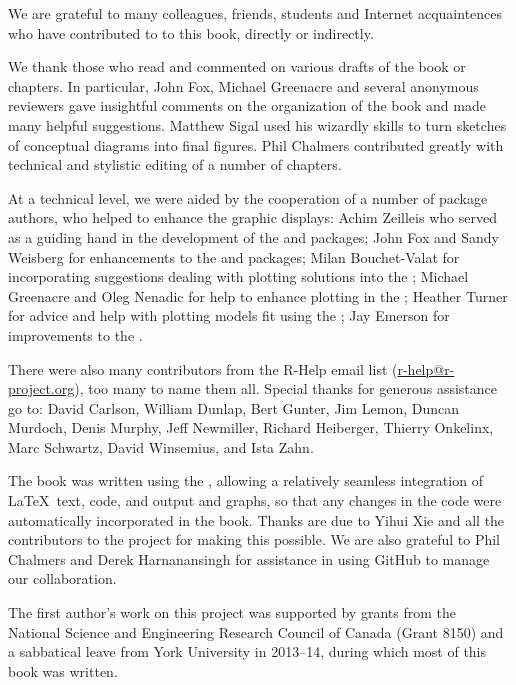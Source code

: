 We are grateful to many colleagues, friends, students and Internet acquaintences who have contributed to
to this book, directly or indirectly.

We thank those who read and commented on various drafts of the book or chapters.
In particular, John Fox, Michael Greenacre and several anonymous reviewers gave
insightful comments on the organization of the book and made many helpful suggestions.
Matthew Sigal used his wizardly skills to turn sketches of conceptual diagrams into
final figures. Phil Chalmers contributed greatly with technical and stylistic editing
of a number of chapters.

At a technical level, we were aided by the cooperation of a number of \R package authors, who
helped to enhance the graphic displays:
Achim Zeilleis who served as a guiding hand in the development of the  and  packages;
John Fox and Sandy Weisberg for enhancements to the  and  packages;
Milan Bouchet-Valat for incorporating suggestions dealing with plotting  solutions into the ;
Michael Greenacre and Oleg Nenadic for help to enhance plotting in the ;
Heather Turner for advice and help with plotting models fit using the ;
Jay Emerson for improvements to the .

There were also many contributors from the R-Help email list (\url{r-help@r-project.org}), too many to name them all.
Special thanks for generous assistance go to:
David Carlson,
William Dunlap,
Bert Gunter,
Jim Lemon,
Duncan Murdoch,
Denis Murphy,
Jeff Newmiller,
Richard Heiberger,
Thierry Onkelinx,
Marc Schwartz,
David Winsemius, and
Ista Zahn.

The book was written using the , allowing a relatively seamless 
integration of \LaTeX\  text, \R code, and \R output and graphs, so that any changes
in the code were automatically incorporated in the book.
Thanks are due to Yihui Xie and all the contributors to the  project
for making this possible.  We are also grateful to Phil Chalmers and Derek Harnanansingh
for assistance in using GitHub to manage our collaboration.

The first author's work on this project was supported by grants from the
National Science and Engineering Research Council of Canada (Grant 8150)
and a sabbatical leave from York University in 2013--14, during which most
of this book was written.

